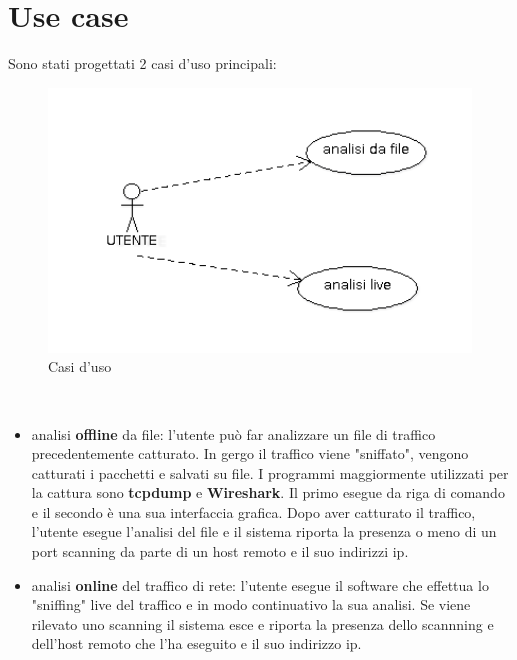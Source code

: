 \documentclass[a4paper,12pt]{article} %
\begin{document}
\newpage

\section{Use case}

Sono stati progettati 2 casi d'uso principali:
\begin{figure}[htbp]
 \begin{center}
  \includegraphics[width=15cm]{usecase1.png}
  \end{center}
  \caption{\label{fig_caso_generale} Casi d'uso}
 \end{figure}\\


\begin{itemize}


\item analisi \textbf{offline} da file: l'utente può far analizzare un file di traffico precedentemente catturato. In gergo
il traffico viene "sniffato", vengono catturati i pacchetti e salvati su file. I programmi maggiormente utilizzati per la cattura sono \textbf{tcpdump} e \textbf{Wireshark}. Il primo esegue da riga di comando e il secondo è una sua interfaccia grafica. Dopo aver catturato il traffico, l'utente esegue l'analisi del file e il sistema riporta 
la presenza o meno di un port scanning da parte di un host remoto e il suo indirizzi ip.

\item analisi \textbf{online} del traffico di rete: l'utente esegue il software che effettua lo "sniffing" live 
del traffico e in modo continuativo la sua analisi. Se viene rilevato uno scanning il sistema esce e riporta la presenza dello scannning e dell'host remoto che l'ha eseguito e il suo indirizzo ip. 

\end{itemize}
\end{document}
